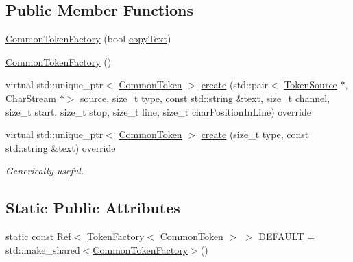 \subsection*{Public Member Functions}
\begin{DoxyCompactItemize}
\item 
\hyperlink{classantlr4_1_1CommonTokenFactory_a580c068f46164c58052858432bbf974c}{Common\+Token\+Factory} (bool \hyperlink{classantlr4_1_1CommonTokenFactory_a944c106da2cf4638ea989bcb20b482df}{copy\+Text})
\item 
\hyperlink{classantlr4_1_1CommonTokenFactory_a4bf0a30d96f0239d56c72d0b5dc634f7}{Common\+Token\+Factory} ()
\item 
virtual std\+::unique\+\_\+ptr$<$ \hyperlink{classantlr4_1_1CommonToken}{Common\+Token} $>$ \hyperlink{classantlr4_1_1CommonTokenFactory_ae5b0ee244ce69cf24a71c81167328be1}{create} (std\+::pair$<$ \hyperlink{classantlr4_1_1TokenSource}{Token\+Source} $\ast$, Char\+Stream $\ast$$>$ source, size\+\_\+t type, const std\+::string \&text, size\+\_\+t channel, size\+\_\+t start, size\+\_\+t stop, size\+\_\+t line, size\+\_\+t char\+Position\+In\+Line) override
\item 
\mbox{\label{classantlr4_1_1CommonTokenFactory_a9b21aad910d0976a291c7b4aed688aad}} 
virtual std\+::unique\+\_\+ptr$<$ \hyperlink{classantlr4_1_1CommonToken}{Common\+Token} $>$ \hyperlink{classantlr4_1_1CommonTokenFactory_a9b21aad910d0976a291c7b4aed688aad}{create} (size\+\_\+t type, const std\+::string \&text) override
\begin{DoxyCompactList}\small\item\em Generically useful. \end{DoxyCompactList}\end{DoxyCompactItemize}
\subsection*{Static Public Attributes}
\begin{DoxyCompactItemize}
\item 
static const Ref$<$ \hyperlink{classantlr4_1_1TokenFactory}{Token\+Factory}$<$ \hyperlink{classantlr4_1_1CommonToken}{Common\+Token} $>$ $>$ \hyperlink{classantlr4_1_1CommonTokenFactory_a141e9716e14a7b5c43a6d0bd3db82bcd}{D\+E\+F\+A\+U\+LT} = std\+::make\+\_\+shared$<$\hyperlink{classantlr4_1_1CommonTokenFactory}{Common\+Token\+Factory}$>$()
\end{DoxyCompactItemize}
